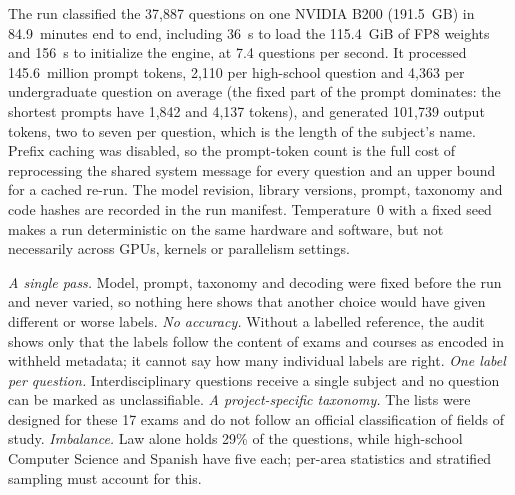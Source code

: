 The run classified the 37,887 questions on one NVIDIA B200 (191.5~GB) in
84.9~minutes end to end, including 36~s to load the 115.4~GiB of FP8
weights and 156~s to initialize the engine, at 7.4 questions per second. It
processed 145.6~million prompt tokens, 2,110 per high-school question and
4,363 per undergraduate question on average (the fixed part of the prompt
dominates: the shortest prompts have 1,842 and 4,137 tokens), and generated
101,739 output tokens, two to seven per question, which is the length of
the subject's name. Prefix caching was disabled, so the prompt-token count is
the full cost of reprocessing the shared system message for every question and
an upper bound for a cached re-run. The model revision, library versions,
prompt, taxonomy and code hashes are recorded in the run manifest.
Temperature~0 with a fixed seed makes a run deterministic on the same
hardware and software, but not necessarily across GPUs, kernels or
parallelism settings.

\emph{A single pass.} Model, prompt, taxonomy and decoding were fixed before
the run and never varied, so nothing here shows that another choice would
have given different or worse labels.
\emph{No accuracy.} Without a labelled reference, the audit shows only that
the labels follow the content of exams and courses as encoded in withheld
metadata; it cannot say how many individual labels are right.
\emph{One label per question.} Interdisciplinary questions receive a single
subject and no question can be marked as unclassifiable.
\emph{A project-specific taxonomy.} The lists were designed for these 17
exams and do not follow an official classification of fields of study.
\emph{Imbalance.} Law alone holds 29\% of the questions, while high-school
Computer Science and Spanish have five each; per-area statistics and
stratified sampling must account for this.
